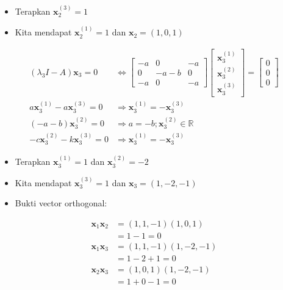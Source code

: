 \documentclass[12pt, a4paper]{scrartcl}
\begin{document}
\begin{enumerate}
            \begin{itemize}
                \item[] Terapkan $\textbf{x}_2^{(3)}=1$
                \item[] Kita mendapat $\textbf{x}_2^{(1)}=1$ dan $\textbf{x}_2=(1,0,1)$
            \end{itemize}
            \begin{align*}
                (\lambda_3I-A)\textbf{x}_3=0 &\Leftrightarrow \begin{bmatrix}
                    -a&0&-a\\0&-a-b&0\\-a&0&-a
                \end{bmatrix}\begin{bmatrix}
                    \textbf{x}_3^{(1)} \\ \textbf{x}_3^{(2)} \\ \textbf{x}_3^{(3)}
                \end{bmatrix} = \begin{bmatrix}
                    0\\0\\0
                \end{bmatrix}
                \\ a\textbf{x}_3^{(1)} - a\textbf{x}_3^{(3)} = 0 &\Rightarrow \textbf{x}_3^{(1)} = -\textbf{x}_3^{(3)}
                \\ (-a-b)\textbf{x}_3^{(2)}= 0 &\Rightarrow a=-b;\textbf{x}_3^{(2)} \in \mathbb{R}
                \\ -c\textbf{x}_3^{(2)} - k\textbf{x}_3^{(3)} = 0 &\Rightarrow \textbf{x}_3^{(1)} = -\textbf{x}_3^{(3)} 
            \end{align*}

            \begin{itemize}
                \item[] Terapkan $\textbf{x}_3^{(1)}=1$ dan $\textbf{x}_3^{(2)}=-2$
                \item[] Kita mendapat $\textbf{x}_3^{(3)}=1$ dan $\textbf{x}_3=(1,-2,-1)$
                \item[] Bukti vector orthogonal:
            \end{itemize}
            \begin{align*}
                \textbf{x}_1 \textbf{x}_2 &= (1,1,-1)(1,0,1)
                \\ &= 1-1 = 0
                \\ \textbf{x}_1 \textbf{x}_3 &= (1,1,-1) (1,-2,-1)
                \\ &= 1-2+1 = 0
                \\ \textbf{x}_2 \textbf{x}_3 &= (1,0,1)(1,-2,-1)
                \\ &= 1+0-1=0 
            \end{align*}


\end{enumerate}
\end{document}
